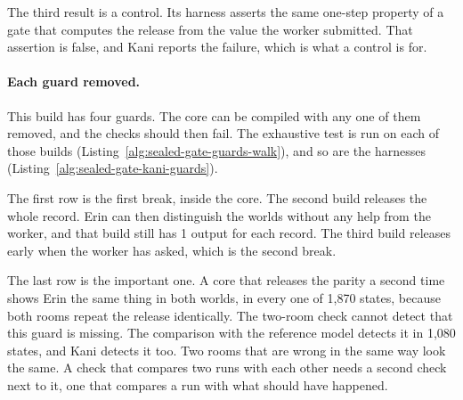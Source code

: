 
The third result is a control. Its harness asserts the same one-step
property of a gate that computes the release from the value the worker
submitted. That assertion is false, and Kani reports the failure, which
is what a control is for.

\paragraph{Each guard removed.}
This build has four guards. The core can be compiled with any one of them
removed, and the checks should then fail. The exhaustive test is run on
each of those builds (Listing~\ref{alg:sealed-gate-guards-walk}), and so
are the harnesses (Listing~\ref{alg:sealed-gate-kani-guards}).

The first row is the first break, inside the core. The second build
releases the whole record. Erin can then distinguish the worlds without
any help from the worker, and that build still has 1 output for each
record. The third build releases early when the worker has asked, which
is the second break.

The last row is the important one. A core that releases the parity a
second time shows Erin the same thing in both worlds, in every one of
1,870 states, because both rooms repeat the release identically. The
two-room check cannot detect that this guard is missing. The comparison
with the reference model detects it in 1,080 states, and Kani detects it
too. Two rooms that are wrong in the same way look the same. A check that
compares two runs with each other needs a second check next to it, one
that compares a run with what should have happened.




